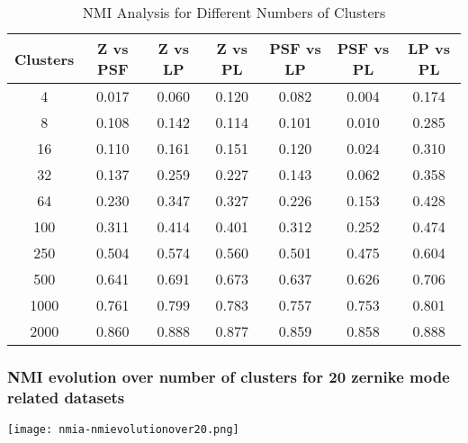 \begin{table}[h!]
\centering
\begin{tabular}{|c|c|c|c|c|c|c|}
\hline
\textbf{Clusters} & \textbf{Z vs PSF} & \textbf{Z vs LP} & \textbf{Z vs PL} & \textbf{PSF vs LP} & \textbf{PSF vs PL} & \textbf{LP vs PL} \\
\hline
4 & 0.017 & 0.060 & 0.120 & 0.082 & 0.004 & 0.174 \\
8 & 0.108 & 0.142 & 0.114 & 0.101 & 0.010 & 0.285 \\
16 & 0.110 & 0.161 & 0.151 & 0.120 & 0.024 & 0.310 \\
32 & 0.137 & 0.259 & 0.227 & 0.143 & 0.062 & 0.358 \\
64 & 0.230 & 0.347 & 0.327 & 0.226 & 0.153 & 0.428 \\
100 & 0.311 & 0.414 & 0.401 & 0.312 & 0.252 & 0.474 \\
250 & 0.504 & 0.574 & 0.560 & 0.501 & 0.475 & 0.604 \\
500 & 0.641 & 0.691 & 0.673 & 0.637 & 0.626 & 0.706 \\
1000 & 0.761 & 0.799 & 0.783 & 0.757 & 0.753 & 0.801 \\
2000 & 0.860 & 0.888 & 0.877 & 0.859 & 0.858 & 0.888 \\
\hline
\end{tabular}
\caption{NMI Analysis for Different Numbers of Clusters}
\end{table}
		\FloatBarrier
		
	\subsubsection{NMI evolution over number of clusters for 20 zernike mode related datasets}
		\begin{figure*}[ht!]
			\centering
			\texttt{[image: nmia-nmievolutionover20.png]}
		\end{figure*}
		
